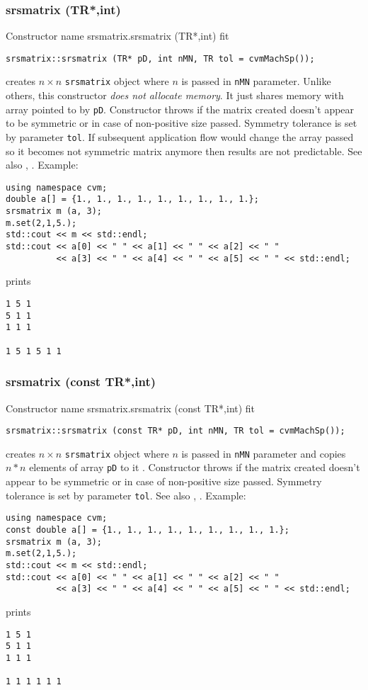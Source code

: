 \subsubsection{srsmatrix (TR*,int)}
Constructor%
\pdfdest name {srsmatrix.srsmatrix (TR*,int)} fit
\begin{verbatim}
srsmatrix::srsmatrix (TR* pD, int nMN, TR tol = cvmMachSp());
\end{verbatim}
creates  $n\times n$ \verb"srsmatrix" object where $n$ is passed in
\verb"nMN" parameter.
Unlike others, this constructor \textit{does not allocate  memory}.
It just shares  memory with  array pointed to by \verb"pD".
Constructor throws  
if the matrix created doesn't appear to be symmetric 
or in case of non-positive size passed. Symmetry tolerance is
set by parameter \verb'tol'.
If subsequent application flow would change the array passed so
it becomes not symmetric matrix anymore then results are not predictable.
See also ,
.
Example:
\begin{Verbatim}
using namespace cvm;
double a[] = {1., 1., 1., 1., 1., 1., 1., 1., 1.};
srsmatrix m (a, 3);
m.set(2,1,5.);
std::cout << m << std::endl;
std::cout << a[0] << " " << a[1] << " " << a[2] << " "
          << a[3] << " " << a[4] << " " << a[5] << " " << std::endl;
\end{Verbatim}
prints
\begin{Verbatim}
1 5 1
5 1 1
1 1 1

1 5 1 5 1 1
\end{Verbatim}
\newpage


\subsubsection{srsmatrix (const TR*,int)}
Constructor%
\pdfdest name {srsmatrix.srsmatrix (const TR*,int)} fit
\begin{verbatim}
srsmatrix::srsmatrix (const TR* pD, int nMN, TR tol = cvmMachSp());
\end{verbatim}
creates  $n\times n$ \verb"srsmatrix" object where $n$ is passed in
\verb"nMN" parameter
and copies $n*n$ elements of  array \verb"pD" to it .
Constructor throws  
if the matrix created doesn't appear to be symmetric 
or in case of non-positive size passed. Symmetry tolerance is
set by parameter \verb'tol'.
See also ,
.
Example:
\begin{Verbatim}
using namespace cvm;
const double a[] = {1., 1., 1., 1., 1., 1., 1., 1., 1.};
srsmatrix m (a, 3);
m.set(2,1,5.);
std::cout << m << std::endl;
std::cout << a[0] << " " << a[1] << " " << a[2] << " "
          << a[3] << " " << a[4] << " " << a[5] << " " << std::endl;
\end{Verbatim}
prints
\begin{Verbatim}
1 5 1
5 1 1
1 1 1

1 1 1 1 1 1
\end{Verbatim}
\newpage


